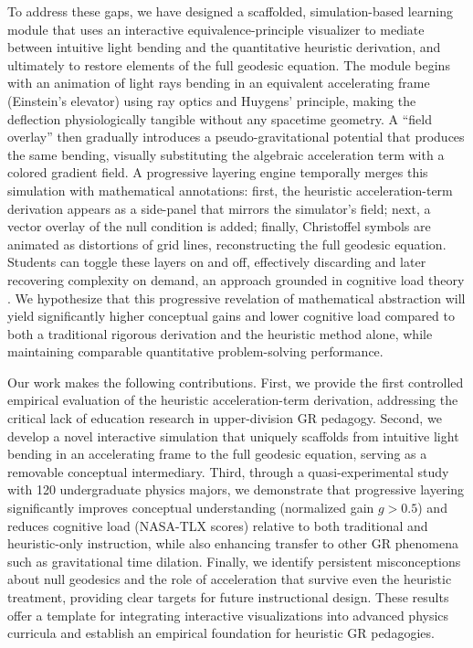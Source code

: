 \documentclass{article}
\begin{document}
To address these gaps, we have designed a scaffolded, simulation-based learning module that uses an interactive equivalence-principle visualizer to mediate between intuitive light bending and the quantitative heuristic derivation, and ultimately to restore elements of the full geodesic equation. The module begins with an animation of light rays bending in an equivalent accelerating frame (Einstein’s elevator) using ray optics and Huygens’ principle, making the deflection physiologically tangible without any spacetime geometry. A “field overlay” then gradually introduces a pseudo-gravitational potential that produces the same bending, visually substituting the algebraic acceleration term with a colored gradient field. A progressive layering engine temporally merges this simulation with mathematical annotations: first, the heuristic acceleration-term derivation appears as a side-panel that mirrors the simulator’s field; next, a vector overlay of the null condition is added; finally, Christoffel symbols are animated as distortions of grid lines, reconstructing the full geodesic equation. Students can toggle these layers on and off, effectively discarding and later recovering complexity on demand, an approach grounded in cognitive load theory \cite{sweller1988cognitive,renkl2002worked}. We hypothesize that this progressive revelation of mathematical abstraction will yield significantly higher conceptual gains and lower cognitive load compared to both a traditional rigorous derivation and the heuristic method alone, while maintaining comparable quantitative problem-solving performance.

Our work makes the following contributions. First, we provide the first controlled empirical evaluation of the heuristic acceleration-term derivation, addressing the critical lack of education research in upper-division GR pedagogy. Second, we develop a novel interactive simulation that uniquely scaffolds from intuitive light bending in an accelerating frame to the full geodesic equation, serving as a removable conceptual intermediary. Third, through a quasi-experimental study with 120 undergraduate physics majors, we demonstrate that progressive layering significantly improves conceptual understanding (normalized gain \(g > 0.5\)) and reduces cognitive load (NASA-TLX scores) relative to both traditional and heuristic-only instruction, while also enhancing transfer to other GR phenomena such as gravitational time dilation. Finally, we identify persistent misconceptions about null geodesics and the role of acceleration that survive even the heuristic treatment, providing clear targets for future instructional design. These results offer a template for integrating interactive visualizations into advanced physics curricula and establish an empirical foundation for heuristic GR pedagogies.
\end{document}
